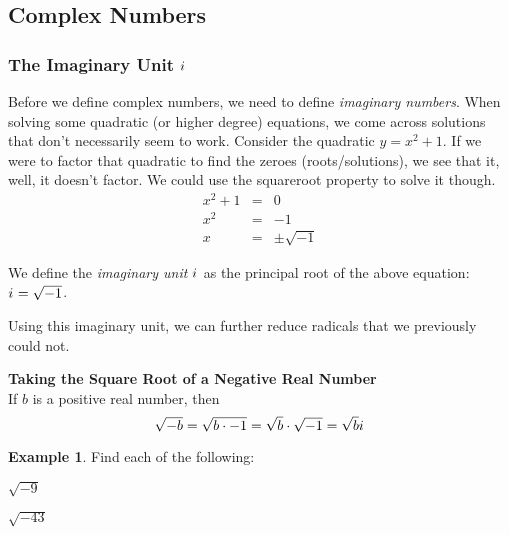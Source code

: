 \documentclass[addpoints,12pt]{exam}
\theoremstyle{definition}
\newtheorem{example}{Example}[subsection]
\newcommand{\iu}{{i\mkern1mu}}
\begin{document}
\setcounter{section}{10}
\setcounter{subsection}{6}

\subsection{Complex Numbers}

\subsubsection*{The Imaginary Unit $\iu$}
Before we define complex numbers, we need to define \emph{imaginary numbers}. When solving some quadratic (or higher degree) equations, we come across solutions that don't necessarily seem to work. Consider the quadratic $y = x^2 +1$. If we were to factor that quadratic to find the zeroes (roots/solutions), we see that it, well, it doesn't factor. We could use the squareroot property to solve it though.
\begin{eqnarray*}
x^2 + 1 &=& 0\\
x^2 &=& -1\\
x &=& \pm\sqrt{-1}
\end{eqnarray*}

We define the \emph{imaginary unit} $\iu$ as the principal root of the above equation: $\iu = \sqrt{-1}$.

Using this imaginary unit, we can further reduce radicals that we previously could not.

\begin{mdframed}
\textbf{Taking the Square Root of a Negative Real Number}\mbox{}\\
If $b$ is a positive real number, then \[\sqrt{-b} = \sqrt{b\cdot -1} = \sqrt{b}\cdot\sqrt{-1} = \sqrt{b}\iu\]
\end{mdframed}

\begin{example}
Find each of the following:
\begin{enumerate}
\begin{minipage}{.5\textwidth}
\item $\sqrt{-9}$
\end{minipage}%
\begin{minipage}{.5\textwidth}
\item $\sqrt{-43}$
\end{minipage}%
\end{enumerate}
\vspace{1.5in}
\end{example}

\vspace{.25in}
\end{document}
